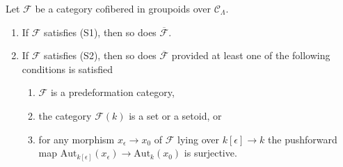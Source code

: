 \begin{lemma}
\label{lemma-S1-S2-associated-functor}
Let $\mathcal{F}$ be a category cofibered in groupoids over
$\mathcal{C}_\Lambda$. 
\begin{enumerate}
\item If $\mathcal{F}$ satisfies (S1), then so does 
$\overline{\mathcal{F}}$. 
\item If $\mathcal{F}$ satisfies (S2), then so does 
$\overline{\mathcal{F}}$ provided at least one of the following conditions is
satisfied
\begin{enumerate}
\item $\mathcal{F}$ is a predeformation category,
\item the category $\mathcal{F}(k)$ is a set or a setoid, or
\item for any morphism $x_\epsilon \to x_0$ of $\mathcal{F}$
lying over $k[\epsilon] \to k$ the pushforward map
$\text{Aut}_{k[\epsilon]}(x_\epsilon) \to \text{Aut}_k(x_0)$
is surjective.
\end{enumerate}
\end{enumerate}
\end{lemma}

